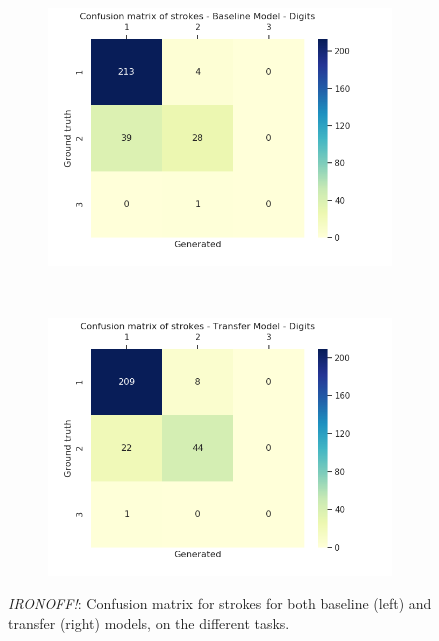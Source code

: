 \begin{figure}[!htbp]
        ~
        \begin{subfigure}[tb]{0.45\textwidth}
            \includegraphics[width=\textwidth]{images/sota/ironoff_results/True_digits_strokes_heatmap.png}
        \end{subfigure}
        ~
        \begin{subfigure}[tb]{0.45\textwidth}
            \includegraphics[width=\textwidth]{images/sota/ironoff_results/False_digits_strokes_heatmap.png}
        \end{subfigure}

        \caption{\textit{IRONOFF!}: Confusion matrix for strokes for both baseline (left) and transfer (right) models, on the different tasks.}
        \label{fig:ironoff_strokes_cnf}

      \end{figure}

